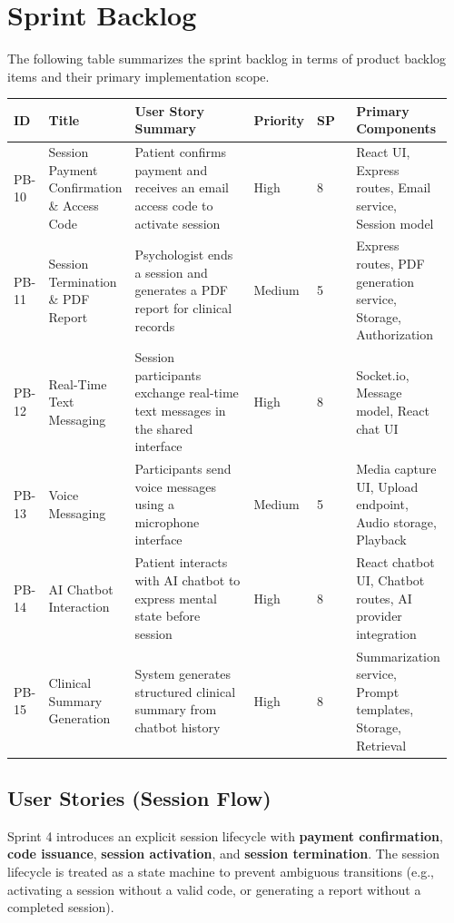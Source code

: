 \documentclass[12pt]{article}
\begin{document}
\section{Sprint Backlog}
The following table summarizes the sprint backlog in terms of product backlog items and their primary implementation scope.

\begin{longtable}{L{0.08\linewidth} L{0.18\linewidth} L{0.32\linewidth} L{0.10\linewidth} L{0.10\linewidth} L{0.18\linewidth}}
\toprule
\textbf{ID} & \textbf{Title} & \textbf{User Story Summary} & \textbf{Priority} & \textbf{SP} & \textbf{Primary Components} \\
\midrule
\endhead
PB-10 & Session Payment Confirmation \& Access Code & Patient confirms payment and receives an email access code to activate session & High & 8 & React UI, Express routes, Email service, Session model \\
PB-11 & Session Termination \& PDF Report & Psychologist ends a session and generates a PDF report for clinical records & Medium & 5 & Express routes, PDF generation service, Storage, Authorization \\
PB-12 & Real-Time Text Messaging & Session participants exchange real-time text messages in the shared interface & High & 8 & Socket.io, Message model, React chat UI \\
PB-13 & Voice Messaging & Participants send voice messages using a microphone interface & Medium & 5 & Media capture UI, Upload endpoint, Audio storage, Playback \\
PB-14 & AI Chatbot Interaction & Patient interacts with AI chatbot to express mental state before session & High & 8 & React chatbot UI, Chatbot routes, AI provider integration \\
PB-15 & Clinical Summary Generation & System generates structured clinical summary from chatbot history & High & 8 & Summarization service, Prompt templates, Storage, Retrieval \\
\bottomrule
\end{longtable}

\subsection{User Stories (Session Flow)}
Sprint 4 introduces an explicit session lifecycle with \textbf{payment confirmation}, \textbf{code issuance}, \textbf{session activation}, and \textbf{session termination}. The session lifecycle is treated as a state machine to prevent ambiguous transitions (e.g., activating a session without a valid code, or generating a report without a completed session).
\end{document}
